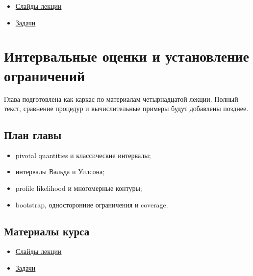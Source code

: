 \documentclass[
  russian,
  12pt,
  a4paper,
  a4paper,
  openany]{scrbook}
\providecommand{\tightlist}{%
  \setlength{\itemsep}{0pt}\setlength{\parskip}{0pt}}
\begin{document}
\begin{itemize}
\tightlist
\item
  \href{https://neutrinohit.github.io/statistical-analysis-course/ru/slides/12_feldman_cousins_and_cls.html}{Слайды
  лекции}
\item
  \href{https://neutrinohit.github.io/statistical-analysis-course/ru/slides/exercises/12_feldman_cousins_and_cls_exercises.html}{Задачи}
\end{itemize}

\chapter{Интервальные оценки и установление
ограничений}\label{ux438ux43dux442ux435ux440ux432ux430ux43bux44cux43dux44bux435-ux43eux446ux435ux43dux43aux438-ux438-ux443ux441ux442ux430ux43dux43eux432ux43bux435ux43dux438ux435-ux43eux433ux440ux430ux43dux438ux447ux435ux43dux438ux439}

\begin{bookchapteropening}

Глава подготовлена как каркас по материалам четырнадцатой лекции. Полный
текст, сравнение процедур и вычислительные примеры будут добавлены
позднее.

\end{bookchapteropening}

\section{План
главы}\label{ux43fux43bux430ux43d-ux433ux43bux430ux432ux44b-12}

\begin{itemize}
\tightlist
\item
  pivotal quantities и классические интервалы;
\item
  интервалы Вальда и Уилсона;
\item
  profile likelihood и многомерные контуры;
\item
  bootstrap, односторонние ограничения и coverage.
\end{itemize}

\section{Материалы
курса}\label{ux43cux430ux442ux435ux440ux438ux430ux43bux44b-ux43aux443ux440ux441ux430-11}

\begin{itemize}
\tightlist
\item
  \href{https://neutrinohit.github.io/statistical-analysis-course/ru/slides/13_interval_estimation_and_limits.html}{Слайды
  лекции}
\item
  \href{https://neutrinohit.github.io/statistical-analysis-course/ru/slides/exercises/13_interval_estimation_and_limits_exercises.html}{Задачи}
\end{itemize}
\end{document}
